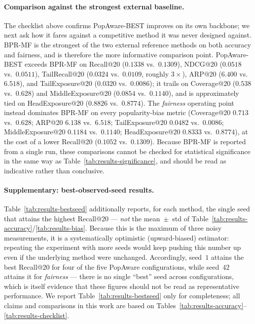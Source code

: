 \paragraph{Comparison against the strongest external baseline.}
The checklist above confirms PopAware-BEST improves on its own backbone; we next ask how it
fares against a competitive method it was never designed against. BPR-MF is the strongest of
the two external reference methods on both accuracy and fairness, and is therefore the more
informative comparison point. PopAware-BEST exceeds BPR-MF on
Recall@20 ($0.1338$ vs.\ $0.1309$), NDCG@20 ($0.0518$ vs.\ $0.0511$), TailRecall@20 ($0.0324$
vs.\ $0.0109$, roughly $3\times$), ARP@20 ($6.400$ vs.\ $6.518$), and TailExposure@20
($0.0320$ vs.\ $0.0086$); it trails on Coverage@20 ($0.538$ vs.\ $0.628$) and
MiddleExposure@20 ($0.0854$ vs.\ $0.1140$), and is approximately tied on HeadExposure@20
($0.8826$ vs.\ $0.8774$). The \emph{fairness} operating point instead dominates BPR-MF on
every popularity-bias metric (Coverage@20 $0.713$ vs.\ $0.628$; ARP@20 $6.138$ vs.\ $6.518$;
TailExposure@20 $0.0482$ vs.\ $0.0086$; MiddleExposure@20 $0.1184$ vs.\ $0.1140$;
HeadExposure@20 $0.8333$ vs.\ $0.8774$), at the cost of a lower Recall@20 ($0.1052$ vs.\
$0.1309$). Because BPR-MF is reported from a single run, these comparisons cannot be checked
for statistical significance in the same way as Table~\ref{tab:results-significance}, and
should be read as indicative rather than conclusive.

\paragraph{Supplementary: best-observed-seed results.}
Table~\ref{tab:results-bestseed} additionally reports, for each method, the single seed that
attains the highest Recall@20 --- \emph{not} the mean~$\pm$~std of Table~\ref{tab:results-accuracy}/\ref{tab:results-bias}. Because this is the maximum of three noisy
measurements, it is a systematically optimistic (upward-biased) estimator: repeating the
experiment with more seeds would keep pushing this number up even if the underlying method
were unchanged. Accordingly, seed~$1$ attains the best Recall@20 for four of the five PopAware
configurations, while seed~$42$ attains it for \emph{fairness} --- there is no single ``best''
seed across configurations, which is itself evidence that these figures should not be read as
representative performance. We report Table~\ref{tab:results-bestseed} only for
completeness; all claims and comparisons in this work are based on
Tables~\ref{tab:results-accuracy}--\ref{tab:results-checklist}.

